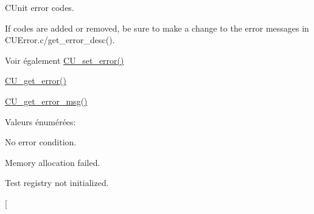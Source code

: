 C\-Unit error codes. 

If codes are added or removed, be sure to make a change to the error messages in C\-U\-Error.\-c/get\-\_\-error\-\_\-desc(). \begin{DoxySeeAlso}{Voir également}
\hyperlink{group__Framework_ga2e817abf46a330a699fe5f472f5bfd64}{C\-U\-\_\-set\-\_\-error()} 

\hyperlink{group__Framework_ga0bf3f9733e5fa0c0ed6ca0a37a2d995e}{C\-U\-\_\-get\-\_\-error()} 

\hyperlink{group__Framework_gaee27bf496da77437288bc9fe2a0b20ed}{C\-U\-\_\-get\-\_\-error\-\_\-msg()} 
\end{DoxySeeAlso}
\begin{Desc}
\item[Valeurs énumérées\-: ]\par
\begin{description}
\item[{\em 
\hypertarget{group__Framework_gga743a2a025ee3eb792d7d85f0eea347e6afcb0cc348cf634702f1c5e25935d44a8}{C\-U\-E\-\_\-\-S\-U\-C\-C\-E\-S\-S}\label{group__Framework_gga743a2a025ee3eb792d7d85f0eea347e6afcb0cc348cf634702f1c5e25935d44a8}
}]No error condition. \item[{\em 
\hypertarget{group__Framework_gga743a2a025ee3eb792d7d85f0eea347e6a2f82abb90b2a2d492db87e448fe94695}{C\-U\-E\-\_\-\-N\-O\-M\-E\-M\-O\-R\-Y}\label{group__Framework_gga743a2a025ee3eb792d7d85f0eea347e6a2f82abb90b2a2d492db87e448fe94695}
}]Memory allocation failed. \item[{\em 
\hypertarget{group__Framework_gga743a2a025ee3eb792d7d85f0eea347e6a16db381bf73522f2066dbbb2324ae43e}{C\-U\-E\-\_\-\-N\-O\-R\-E\-G\-I\-S\-T\-R\-Y}\label{group__Framework_gga743a2a025ee3eb792d7d85f0eea347e6a16db381bf73522f2066dbbb2324ae43e}
}]Test registry not initialized. \item[{\em 
}
\end{description}
\end{Desc}
